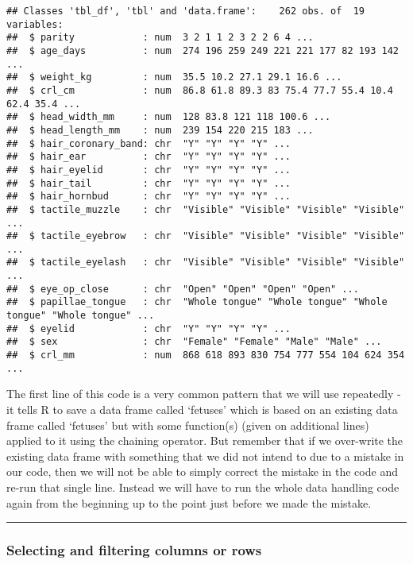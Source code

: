 \documentclass[
]{article}
\begin{document}
\begin{verbatim}
## Classes 'tbl_df', 'tbl' and 'data.frame':    262 obs. of  19 variables:
##  $ parity            : num  3 2 1 1 2 3 2 2 6 4 ...
##  $ age_days          : num  274 196 259 249 221 221 177 82 193 142 ...
##  $ weight_kg         : num  35.5 10.2 27.1 29.1 16.6 ...
##  $ crl_cm            : num  86.8 61.8 89.3 83 75.4 77.7 55.4 10.4 62.4 35.4 ...
##  $ head_width_mm     : num  128 83.8 121 118 100.6 ...
##  $ head_length_mm    : num  239 154 220 215 183 ...
##  $ hair_coronary_band: chr  "Y" "Y" "Y" "Y" ...
##  $ hair_ear          : chr  "Y" "Y" "Y" "Y" ...
##  $ hair_eyelid       : chr  "Y" "Y" "Y" "Y" ...
##  $ hair_tail         : chr  "Y" "Y" "Y" "Y" ...
##  $ hair_hornbud      : chr  "Y" "Y" "Y" "Y" ...
##  $ tactile_muzzle    : chr  "Visible" "Visible" "Visible" "Visible" ...
##  $ tactile_eyebrow   : chr  "Visible" "Visible" "Visible" "Visible" ...
##  $ tactile_eyelash   : chr  "Visible" "Visible" "Visible" "Visible" ...
##  $ eye_op_close      : chr  "Open" "Open" "Open" "Open" ...
##  $ papillae_tongue   : chr  "Whole tongue" "Whole tongue" "Whole tongue" "Whole tongue" ...
##  $ eyelid            : chr  "Y" "Y" "Y" "Y" ...
##  $ sex               : chr  "Female" "Female" "Male" "Male" ...
##  $ crl_mm            : num  868 618 893 830 754 777 554 104 624 354 ...
\end{verbatim}

The first line of this code is a very common pattern that we will use
repeatedly - it tells R to save a data frame called `fetuses' which is
based on an existing data frame called `fetuses' but with some
function(s) (given on additional lines) applied to it using the chaining
operator. But remember that if we over-write the existing data frame
with something that we did not intend to due to a mistake in our code,
then we will not be able to simply correct the mistake in the code and
re-run that single line. Instead we will have to run the whole data
handling code again from the beginning up to the point just before we
made the mistake.

\begin{center}\rule{0.5\linewidth}{0.5pt}\end{center}

\hypertarget{selecting-and-filtering-columns-or-rows}{%
\subsubsection{Selecting and filtering columns or
rows}\label{selecting-and-filtering-columns-or-rows}}
\end{document}
